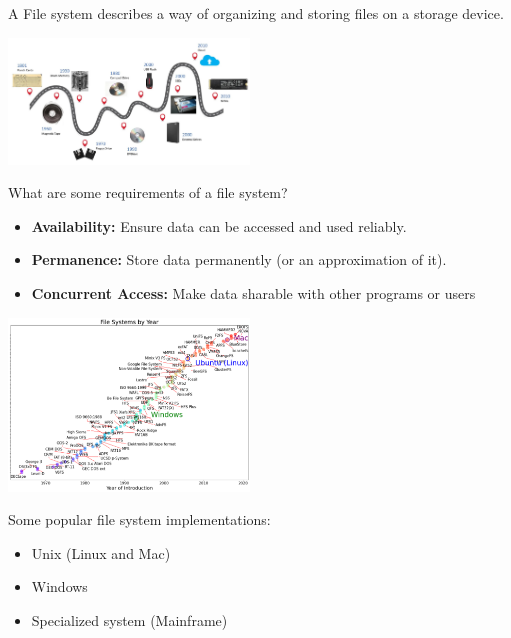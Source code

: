 \begin{slide}


    A File system describes a way of organizing and storing files on a storage device.

    \includegraphics[width=64mm]{file-system-hardware.jpg}
    
    What are some requirements of a file system?
    \begin{itemize}
        \item \textbf{Availability:} Ensure data can be accessed and used reliably.
        \item \textbf{Permanence:} Store data permanently (or an approximation of it).
        \item \textbf{Concurrent Access:} Make data sharable with other programs or users
    \end{itemize}

\end{slide}

\begin{slide}


    \includegraphics[width=64mm]{file-system-implementation.png}
    
    Some popular file system implementations: 
    \begin{itemize}
        \item Unix (Linux and Mac)
        \item Windows
        \item Specialized system (Mainframe)
    \end{itemize}

\end{slide}

